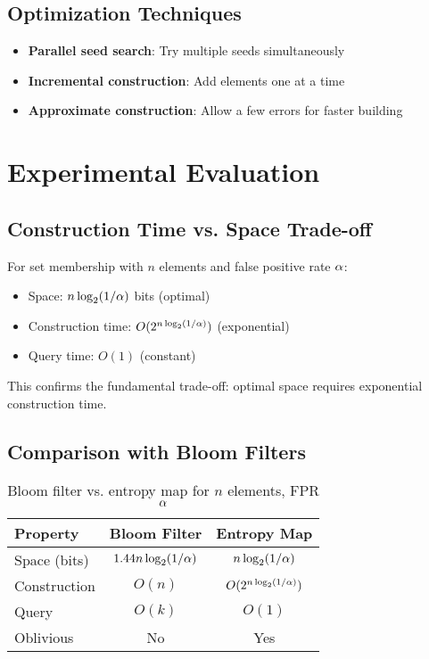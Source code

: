 \documentclass[11pt,final,hidelinks]{article}
\begin{document}
\subsection{Optimization Techniques}

\begin{itemize}
    \item \textbf{Parallel seed search}: Try multiple seeds simultaneously
    \item \textbf{Incremental construction}: Add elements one at a time
    \item \textbf{Approximate construction}: Allow a few errors for faster building
\end{itemize}

\section{Experimental Evaluation}

\subsection{Construction Time vs. Space Trade-off}

For set membership with $n$ elements and false positive rate $\alpha$:
\begin{itemize}
    \item Space: $n \log_2(1/\alpha)$ bits (optimal)
    \item Construction time: $O(2^{n \log_2(1/\alpha)})$ (exponential)
    \item Query time: $O(1)$ (constant)
\end{itemize}

This confirms the fundamental trade-off: optimal space requires exponential construction time.

\subsection{Comparison with Bloom Filters}

\begin{table}[h]
\centering
\begin{tabular}{lcc}
\toprule
Property & Bloom Filter & Entropy Map \\
\midrule
Space (bits) & $1.44n\log_2(1/\alpha)$ & $n\log_2(1/\alpha)$ \\
Construction & $O(n)$ & $O(2^{n\log_2(1/\alpha)})$ \\
Query & $O(k)$ & $O(1)$ \\
Oblivious & No & Yes \\
\bottomrule
\end{tabular}
\caption{Bloom filter vs. entropy map for $n$ elements, FPR $\alpha$}
\end{table}
\end{document}
